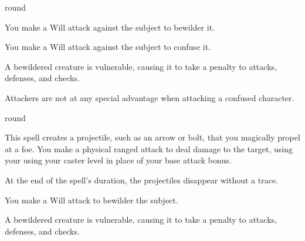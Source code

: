  round
\begin{spellhealthy}
    You make a Will attack against the subject to bewilder it.
\end{spellhealthy}
\begin{spellblood}
    You make a Will attack against the subject to confuse it. \confusionexplanation
\end{spellblood}
\begin{spellnotes}
    A bewildered creature is vulnerable, causing it to take a  penalty to attacks, defenses, and checks.
    \par Attackers are not at any special advantage when attacking a confused character.
\end{spellnotes}

 round
\begin{spelleffect}
    This spell creates a projectile, such as an arrow or bolt, that you magically propel at a foe. You make a physical ranged attack to deal damage to the target, using your using your caster level in place of your base attack bonus.
\end{spelleffect}
\begin{spellnotes}
    At the end of the spell's duration, the projectiles disappear without a trace.
\end{spellnotes}

\spelldur \durshort
{}
\begin{spellhealthy}
    You make a Will attack to bewilder the subject.
\end{spellhealthy}
\begin{spellnotes}
    A bewildered creature is vulnerable, causing it to take a  penalty to attacks, defenses, and checks.
\end{spellnotes}

